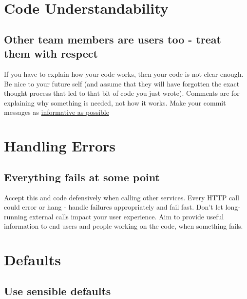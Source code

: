 \documentclass[]{book}
\begin{document}
\hypertarget{understand}{%
\section{Code Understandability}\label{understand}}

\hypertarget{other-team-members-are-users-too---treat-them-with-respect}{%
\subsection{Other team members are users too - treat them with respect}\label{other-team-members-are-users-too---treat-them-with-respect}}

If you have to explain how your code works, then your code is not clear enough.
Be nice to your future self (and assume that they will have forgotten the exact thought process that led to that bit of code you just wrote).
Comments are for explaining why something is needed, not how it works.
Make your commit messages as \href{https://robots.thoughtbot.com/5-useful-tips-for-a-better-commit-message}{informative as possible}

\hypertarget{error}{%
\section{Handling Errors}\label{error}}

\hypertarget{everything-fails-at-some-point}{%
\subsection{Everything fails at some point}\label{everything-fails-at-some-point}}

Accept this and code defensively when calling other services.
Every HTTP call could error or hang - handle failures appropriately and fail fast. Don't let long-running external calls impact your user experience.
Aim to provide useful information to end users and people working on the code, when something fails.

\hypertarget{defaults}{%
\section{Defaults}\label{defaults}}

\hypertarget{use-sensible-defaults}{%
\subsection{Use sensible defaults}\label{use-sensible-defaults}}
\end{document}

